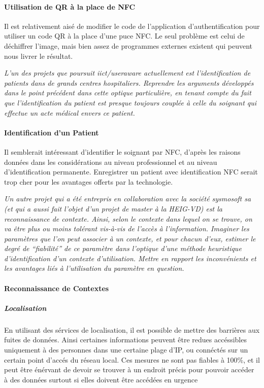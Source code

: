 \documentclass[a4paper,11pt,titlepage]{article}
\begin{document}
\paragraph{Utilisation de QR à la place de NFC}

Il est relativement aisé de modifier le code de l'application d'authentification pour utiliser un code QR à la place d'une puce NFC.
Le seul problème est celui de déchiffrer l'image, mais bien assez de programmes externes existent qui peuvent nous livrer le résultat.

\textit{L'un des projets que poursuit iict/useraware actuellement est l'identification de patients dans de
grands centres hospitaliers. Reprendre les arguments développés dans le point précédent dans cette
optique particulière, en tenant compte du fait que l'identification du patient est presque toujours couplée à
celle du soignant qui effectue un acte médical envers ce patient.}

\paragraph{Identification d'un Patient}
Il semblerait intéressant d'identifier le soignant par NFC, d'après les raisons données dans les considérations au niveau professionnel et au niveau d'identification permanente.
Enregistrer un patient avec identification NFC serait trop cher pour les avantages offerts par la technologie.

\textit{Un autre projet qui a été entrepris en collaboration avec la société sysmosoft sa (et qui a aussi fait
l'objet d'un projet de master à la HEIG-VD) est la reconnaissance  de contexte. Ainsi, selon le contexte dans
lequel on se trouve, on va être plus ou moins tolérant vis-à-vis de l'accès à l'information. Imaginer les
paramètres que l'on peut associer à un contexte, et pour chacun d'eux, estimer le degré de ``fiabilité'' de
ce paramètre dans l'optique d'une méthode heuristique d'identification d'un contexte d'utilisation. Mettre
en rapport les inconvénients et les avantages liés à l'utilisation du paramètre en question.}

\paragraph{Reconnaissance de Contextes}
\subparagraph{Localisation}

En utilisant des sérvices de localisation, il est possible de mettre des barrières aux fuites de données.
Ainsi certaines informations peuvent être redues accéssibles uniquement à des personnes dans une certaine plage d'IP, ou connéctés sur un certain point d'accés du réseau local.
Ces mesures ne sont pas fiables à 100\%, et il peut être énérvant de devoir se trouver à un endroit précis pour pouvoir accéder à des données surtout si elles doivent être accédées en urgence
\end{document}
